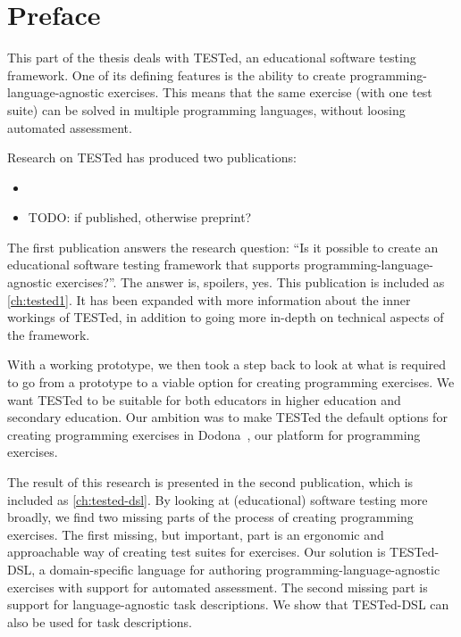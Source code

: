 \documentclass[./main]{subfiles}
\begin{document}
\chapter*{Preface}


This part of the thesis deals with TESTed, an educational software testing framework.
One of its defining features is the ability to create programming-language-agnostic exercises.
This means that the same exercise (with one test suite) can be solved in multiple programming languages, without loosing automated assessment.

Research on TESTed has produced two publications:

\begin{itemize}
    \item {}
    \item TODO: if published, otherwise preprint?
\end{itemize}

The first publication answers the research question: ``Is it possible to create an educational software testing framework that supports programming-language-agnostic exercises?''.
The answer is, spoilers, yes.
This publication is included as \cref{ch:tested1}.
It has been expanded with more information about the inner workings of TESTed, in addition to going more in-depth on technical aspects of the framework.

With a working prototype, we then took a step back to look at what is required to go from a prototype to a viable option for creating programming exercises.
We want TESTed to be suitable for both educators in higher education and secondary education.
Our ambition was to make TESTed the default options for creating programming exercises in Dodona~\autocite{vanpetegemDodonaLearnCode2023}, our platform for programming exercises.

The result of this research is presented in the second publication, which is included as \cref{ch:tested-dsl}.
By looking at (educational) software testing more broadly, we find two missing parts of the process of creating programming exercises.
The first missing, but important, part is an ergonomic and approachable way of creating test suites for exercises.
Our solution is TESTed-DSL, a domain-specific language for authoring programming-language-agnostic exercises with support for automated assessment.
The second missing part is support for language-agnostic task descriptions.
We show that TESTed-DSL can also be used for task descriptions.
\end{document}
